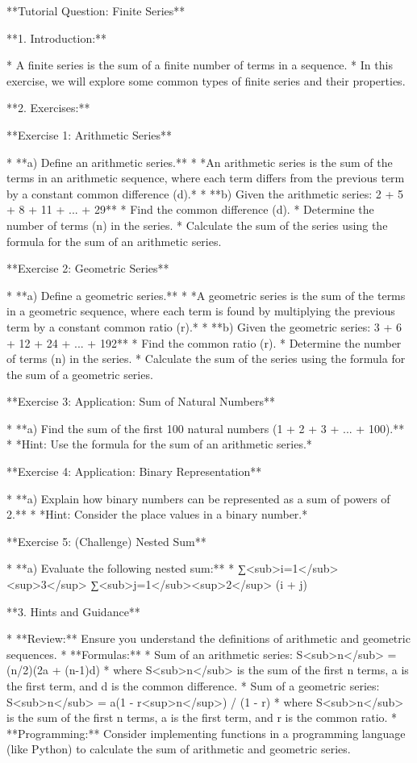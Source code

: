 **Tutorial Question: Finite Series**

**1. Introduction:**

*   A finite series is the sum of a finite number of terms in a sequence. 
*   In this exercise, we will explore some common types of finite series and their properties.

**2. Exercises:**

**Exercise 1: Arithmetic Series**

*   **a) Define an arithmetic series.** 
    *   *An arithmetic series is the sum of the terms in an arithmetic sequence, where each term differs from the previous term by a constant common difference (d).*
*   **b) Given the arithmetic series: 2 + 5 + 8 + 11 + ... + 29**
      *   Find the common difference (d).
      *   Determine the number of terms (n) in the series.
      *   Calculate the sum of the series using the formula for the sum of an arithmetic series. 

**Exercise 2: Geometric Series**

*   **a) Define a geometric series.**
    *   *A geometric series is the sum of the terms in a geometric sequence, where each term is found by multiplying the previous term by a constant common ratio (r).*
*   **b) Given the geometric series: 3 + 6 + 12 + 24 + ... + 192**
      *   Find the common ratio (r).
      *   Determine the number of terms (n) in the series.
      *   Calculate the sum of the series using the formula for the sum of a geometric series.

**Exercise 3: Application: Sum of Natural Numbers**

*   **a) Find the sum of the first 100 natural numbers (1 + 2 + 3 + ... + 100).**
    *   *Hint: Use the formula for the sum of an arithmetic series.*

**Exercise 4: Application: Binary Representation**

*   **a) Explain how binary numbers can be represented as a sum of powers of 2.**
    *   *Hint: Consider the place values in a binary number.*

**Exercise 5: (Challenge) Nested Sum**

*   **a) Evaluate the following nested sum:** 
      *   ∑<sub>i=1</sub><sup>3</sup> ∑<sub>j=1</sub><sup>2</sup> (i + j)

**3. Hints and Guidance**

*   **Review:** Ensure you understand the definitions of arithmetic and geometric sequences.
*   **Formulas:** 
      *   Sum of an arithmetic series: S<sub>n</sub> = (n/2)(2a + (n-1)d) 
          *   where S<sub>n</sub> is the sum of the first n terms, a is the first term, and d is the common difference.
      *   Sum of a geometric series: S<sub>n</sub> = a(1 - r<sup>n</sup>) / (1 - r) 
          *   where S<sub>n</sub> is the sum of the first n terms, a is the first term, and r is the common ratio.
*   **Programming:** Consider implementing functions in a programming language (like Python) to calculate the sum of arithmetic and geometric series.

